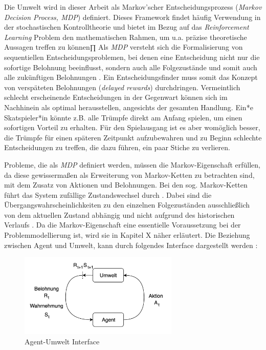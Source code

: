 \par 
Die Umwelt wird in dieser Arbeit als Markov'scher Entscheidungsprozess (\textit{Markov Decision Process, MDP}) definiert. Dieses Framework findet häufig Verwendung in der stochastischen Kontrolltheorie \cite[S.~3]{Gosavi} und bietet im Bezug auf das \textit{Reinforcement Learning} Problem den mathematischen Rahmen, um u.a. präzise theoretische Aussagen treffen zu können∏ Als \textit{MDP} versteht sich die Formalisierung von sequentiellen Entscheidungsproblemen, bei denen eine Entscheidung nicht nur die sofortige Belohnung beeinflusst, sondern auch alle Folgezustände und somit auch alle zukünftigen Belohnungen \cite[S.~47]{Sutton1998}. Ein Entscheidungsfinder muss somit das Konzept von verspäteten Belohnungen (\textit{delayed rewards}) durchdringen. Vermeintlich schlecht erscheinende Entscheidungen in der Gegenwart können sich im Nachhinein als optimal herausstellen, angesichts der gesamten Handlung. Ein*e Skatspieler*in könnte z.B. alle Trümpfe direkt am Anfang spielen, um einen sofortigen Vorteil zu erhalten. Für den Spielausgang ist es aber womöglich besser, die Trümpfe für einen späteren Zeitpunkt aufzubewahren und zu Beginn \glqq schlechte \grqq{} Entscheidungen zu treffen, die dazu führen, ein paar Stiche zu verlieren.
\par 
Probleme, die als \textit{MDP} definiert werden, müssen die Markov-Eigenschaft erfüllen, da diese gewissermaßen als Erweiterung von Markov-Ketten zu betrachten sind, mit dem Zusatz von Aktionen und Belohnungen. Bei den sog. Markov-Ketten führt das System zufällige Zustandswechsel durch \cite[S.~3]{Gosavi}. Dabei sind die Übergangswahrscheinlichkeiten zu den einzelnen Folgezuständen ausschließlich von dem aktuellen Zustand abhängig und nicht aufgrund des historischen Verlaufs \cite[S.~3]{Gosavi}. Da die Markov-Eigenschaft eine essentielle Voraussetzung bei der Problemmodellierung ist, wird sie in Kapitel X näher erläutert. Die Beziehung zwischen Agent und Umwelt, kann durch folgendes Interface dargestellt werden \cite[S.~48]{Sutton1998}:

\par 

\begin{figure}[H]
    \centering
    \includegraphics[height=150px]{images/agentUmweltInterface.png}
    \caption{Agent-Umwelt Interface}
\end{figure}


